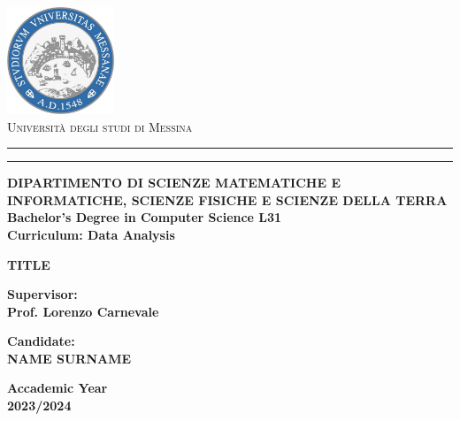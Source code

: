 \begin{titlepage}
    \begin{center}
        \includegraphics[width=0.24\textwidth]{unime-logo.jpg} \\
        [10pt]
        {{\Large{\textsc{Universit\`a degli studi di
        Messina}}}} \rule[0.1cm]{15.8cm}{0.1mm}
        \rule[0.5cm]{15.8cm}{0.6mm}
        {\small{\bf DIPARTIMENTO DI SCIENZE MATEMATICHE E INFORMATICHE, SCIENZE FISICHE E SCIENZE DELLA TERRA\\
        Bachelor's Degree in Computer Science L31 \\
         Curriculum: Data Analysis}}
    \end{center}
    \vspace{15mm}
    
    \begin{center}
        {\LARGE{\bf TITLE}}\\
    \end{center}
    
    \vspace{40mm}
    \par
    
    \noindent
    \begin{minipage}[t]{.5\textwidth}
        \large{
            \bf Supervisor: \\ %
            Prof. Lorenzo Carnevale
        }
    \end{minipage}
    \hfill
    \begin{minipage}[t]{.5\textwidth}
        \raggedleft
        \large{
            \bf Candidate:\\ %
            NAME SURNAME
        }
    \end{minipage}
    
    \vspace{20mm}
    
    \begin{center}{
        \large{
            \bf Accademic Year \\ %
            2023/2024
            }
        }
    \end{center}
\end{titlepage}
